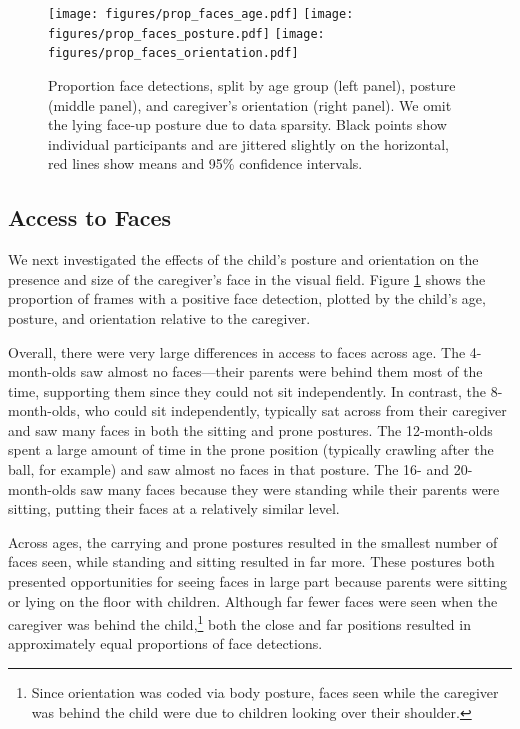 \documentclass[10pt,letterpaper]{article}
\begin{document}
\begin{figure}[t]
\texttt{[image: figures/prop\_faces\_age.pdf]}
\texttt{[image: figures/prop\_faces\_posture.pdf]}
\texttt{[image: figures/prop\_faces\_orientation.pdf]}
\caption{\label{fig:face_dets} Proportion face detections, split by age group (left panel), posture (middle panel), and caregiver's orientation (right panel). We omit the lying face-up posture due to data sparsity. Black points show individual participants and are jittered slightly on the horizontal, red lines show means and 95\% confidence intervals.} 
\end{figure}


\subsection{Access to Faces }

We next investigated the effects of the child's posture and orientation on the presence and size of the caregiver's face in the visual field. Figure \ref{fig:face_dets} shows the proportion of frames with a positive face detection, plotted by the child's age, posture, and orientation relative to the caregiver. 

Overall, there were very large differences in access to faces across age. The 4-month-olds saw almost no faces---their parents were behind them most of the time, supporting them since they could not sit independently. In contrast, the 8-month-olds, who could sit independently, typically sat across from their caregiver and saw many faces in both the sitting and prone postures. The 12-month-olds spent a large amount of time in the prone position (typically crawling after the ball, for example) and saw almost no faces in that posture. The 16- and 20-month-olds saw many faces because they were standing while their parents were sitting, putting their faces at a relatively similar level.

Across ages, the carrying and prone postures resulted in the smallest number of faces seen, while standing and sitting resulted in far more. These postures both presented opportunities for seeing faces in large part because parents were sitting or lying on the floor with children. Although far fewer faces were seen when the caregiver was behind the child,\footnote{Since orientation was coded via body posture, faces seen while the caregiver was behind the child were due to children looking over their shoulder.} both the close and far positions resulted in approximately equal proportions of face detections. 
\end{document}
